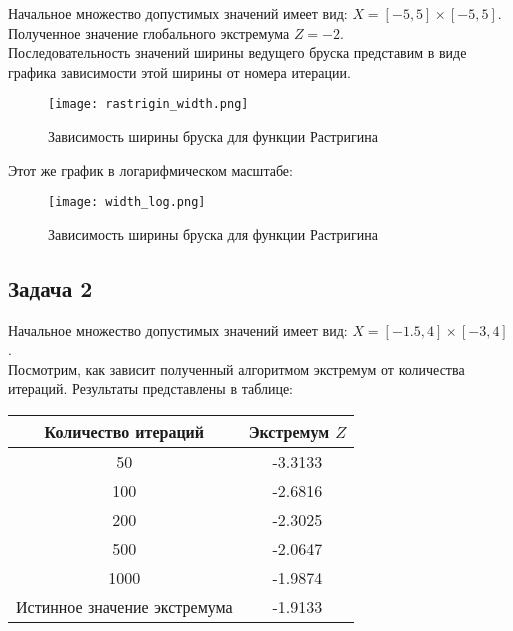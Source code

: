 Начальное множество допустимых значений имеет вид: $X = [-5, 5] \times [-5, 5]$. \\

Полученное значение глобального экстремума $Z=-2$. \\

Последовательность значений ширины ведущего бруска представим в виде графика зависимости этой ширины от номера итерации. \\

\newpage

\begin{figure}[h]
	\centering
	\texttt{[image: rastrigin\_width.png]}
	\caption{Зависимость ширины бруска для функции Растригина}
\end{figure}

Этот же график в логарифмическом масштабе:

\newpage

\begin{figure}[h]
	\centering
	\texttt{[image: width\_log.png]}
	\caption{Зависимость ширины бруска для функции Растригина}
\end{figure}

\subsection{Задача 2}

Начальное множество допустимых значений имеет вид: $X = [-1.5, 4] \times [-3, 4]$. \\

Посмотрим, как зависит полученный алгоритмом экстремум от количества итераций. Результаты представлены в таблице:

\begin{center}
	\begin{tabular}{ |c|c| } 
		\hline
		Количество итераций & Экстремум $Z$ \\ 
		\hline
		50 & -3.3133 \\
		\hline
		100 & -2.6816 \\
		\hline
		200 & -2.3025 \\
		\hline
		500 & -2.0647 \\
		\hline
		1000 & -1.9874 \\
		\hline
		Истинное значение экстремума & -1.9133 \\
		\hline
	\end{tabular}
\end{center}

